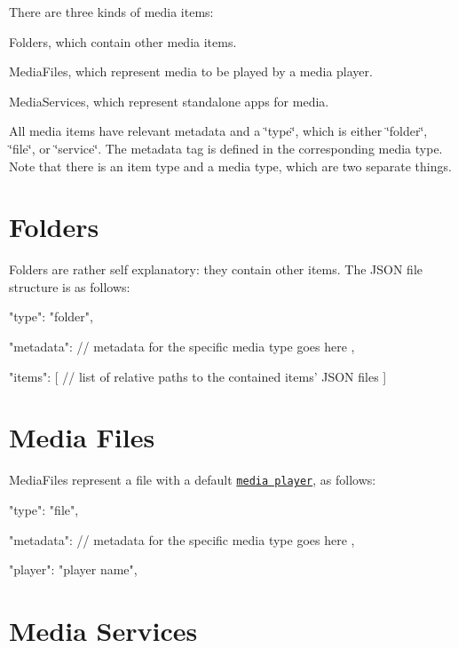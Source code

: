 There are three kinds of media items\-:


\begin{DoxyItemize}
\item {\ttfamily Folder}s, which contain other media items.
\item {\ttfamily Media\-File}s, which represent media to be played by a media player.
\item {\ttfamily Media\-Service}s, which represent standalone apps for media.
\end{DoxyItemize}

All media items have relevant metadata and a {\ttfamily \char`\"{}type\char`\"{}}, which is either {\ttfamily \char`\"{}folder\char`\"{}}, {\ttfamily \char`\"{}file\char`\"{}}, or {\ttfamily \char`\"{}service\char`\"{}}. The {\ttfamily metadata} tag is defined in the corresponding media type. Note that there is an item type and a media type, which are two separate things.

\section*{Folders}

{\ttfamily Folder}s are rather self explanatory\-: they contain other items. The J\-S\-O\-N file structure is as follows\-: \begin{DoxyVerb}{
    "type": "folder",

    "metadata": {
        // metadata for the specific media type goes here
    },

    "items": [
        // list of relative paths to the contained items' JSON files
    ]
}
\end{DoxyVerb}


\section*{Media Files}

{\ttfamily Media\-File}s represent a file with a default \href{../player/README.md>}{\tt media player}, as follows\-: \begin{DoxyVerb}{
    "type": "file",

    "metadata": {
        // metadata for the specific media type goes here
    },

    "player": "player name",
}
\end{DoxyVerb}


\section*{Media Services}

